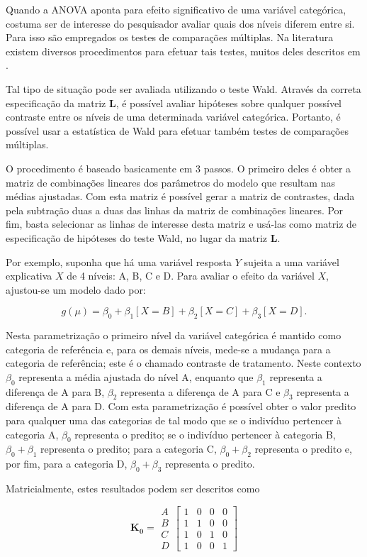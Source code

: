 \documentclass[AMA,STIX1COL]{WileyNJD-v2}
\begin{document}
Quando a ANOVA aponta para efeito significativo de uma variável categórica, costuma ser de interesse do pesquisador avaliar quais dos níveis diferem entre si. Para isso são empregados os testes de comparações múltiplas. Na literatura existem diversos procedimentos para efetuar tais testes, muitos deles descritos em \citet{hsu1996multiple}.

Tal tipo de situação pode ser avaliada utilizando o teste Wald. Através da correta especificação da matriz $\boldsymbol{L}$, é possível avaliar hipóteses sobre qualquer possível contraste entre os níveis de uma determinada variável categórica. Portanto, é possível usar a estatística de Wald para efetuar também testes de comparações múltiplas.

O procedimento é baseado basicamente em 3 passos. O primeiro deles é obter a matriz de combinações lineares dos parâmetros do modelo que resultam nas médias ajustadas. Com esta matriz é possível gerar a matriz de contrastes, dada pela subtração duas a duas das linhas da matriz de combinações lineares. Por fim, basta selecionar as linhas de interesse desta matriz e usá-las como matriz de especificação de hipóteses do teste Wald, no lugar da matriz $\boldsymbol{L}$.
	
Por exemplo, suponha que há uma variável resposta $Y$ sujeita a uma variável explicativa $X$ de 4 níveis: A, B, C e D. Para avaliar o efeito da variável $X$, ajustou-se um modelo dado por:

$$g(\mu) = \beta_0 + \beta_1[X=B] + \beta_2[X=C] + \beta_3[X=D].$$

\noindent Nesta parametrização o primeiro nível da variável categórica é mantido como categoria de referência e, para os demais níveis, mede-se a mudança para a categoria de referência; este é o chamado contraste de tratamento. Neste contexto $\beta_0$ representa a média ajustada do nível A, enquanto que $\beta_1$ representa a diferença de A para B, $\beta_2$ representa a diferença de A para C e $\beta_3$ representa a diferença de A para D. Com esta parametrização é possível obter o valor predito para qualquer uma das categorias de tal modo que se o indivíduo pertencer à categoria A, $\beta_0$ representa o predito; se o indivíduo pertencer à categoria B, $\beta_0 + \beta_1$ representa o predito; para a categoria C, $\beta_0 + \beta_2$ representa o predito e, por fim, para a categoria D, $\beta_0 + \beta_3$ representa o predito.

Matricialmente, estes resultados podem ser descritos como

$$
    \boldsymbol{K_0} = 
      \begin{matrix}
        A\\ 
        B\\ 
        C\\ 
        D 
      \end{matrix} 
    \begin{bmatrix}
      1 & 0 & 0 & 0\\ 
      1 & 1 & 0 & 0\\ 
      1 & 0 & 1 & 0\\ 
      1 & 0 & 0 & 1 
    \end{bmatrix}
$$
\end{document}
